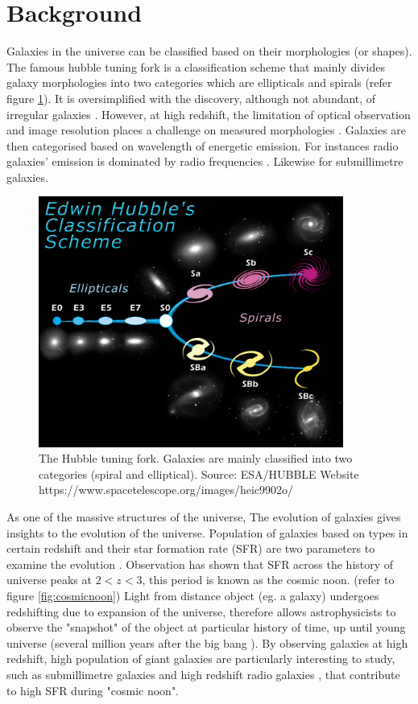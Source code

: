 \documentclass{article}
\begin{document}
\section{Background}
Galaxies in the universe can be classified based on their morphologies (or shapes). The famous hubble tuning fork is a classification scheme that mainly divides galaxy morphologies into two categories which are ellipticals and spirals (refer figure \ref{fig:hubblefork}). It is oversimplified with the discovery, although not abundant, of irregular galaxies \parencite{Gallagher1984}. However, at high redshift, the limitation of optical observation and image resolution places a challenge on measured morphologies \parencite{Rouan2008}. Galaxies are then categorised based on wavelength of energetic emission. For instances radio galaxies' emission is dominated by radio frequencies \parencite{Slijepcevic2022}. Likewise for submillimetre galaxies.
\medskip

\begin{figure}
    \centering
    \includegraphics[width=100mm]{hubble fork.jpg}
    \caption{The Hubble tuning fork. Galaxies are mainly classified into two categories (spiral and elliptical). Source: ESA/HUBBLE Website https://www.spacetelescope.org/images/heic9902o/}
    \label{fig:hubblefork}
\end{figure}

\noindent As one of the massive structures of the universe, The evolution of galaxies gives insights to the evolution
of the universe. Population of galaxies based on types in certain redshift and their star formation rate (SFR) are two parameters to examine the evolution \parencite{Martin2005}. Observation has shown that SFR across the history of universe peaks at $2 < z < 3$, this period is known as the cosmic noon. (refer to figure \ref{fig:cosmicnoon}) Light from distance object (eg. a galaxy) undergoes redshifting due to expansion of the universe, therefore allows astrophysicists to observe the "snapshot" of the object at particular history of time, up until young universe (several million years after the big bang \parencite{Jiang2021}).  By observing galaxies at high redshift, high population of giant galaxies are particularly interesting to study, such as submillimetre galaxies and high redshift radio galaxies \parencite{Singh2014} \parencite{Chapman2005},  that contribute to high SFR during "cosmic noon".
\medskip
\end{document}
